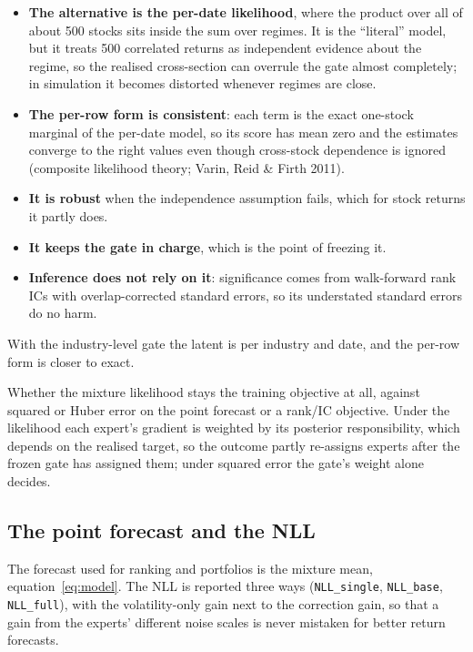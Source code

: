 \begin{whybox}
\begin{itemize}
\item \textbf{The alternative is the per-date likelihood}, where the product over all of about 500 stocks sits inside the
  sum over regimes. It is the ``literal'' model, but it treats 500 correlated returns as independent
  evidence about the regime, so the realised cross-section can overrule the gate almost completely; in
  simulation it becomes distorted whenever regimes are close.
\item \textbf{The per-row form is consistent}: each term is the exact one-stock marginal of the per-date model,
  so its score has mean zero and the estimates converge to the right values even though cross-stock
  dependence is ignored (composite likelihood theory; Varin, Reid \& Firth 2011).
\item \textbf{It is robust} when the independence assumption fails, which for stock returns it partly does.
\item \textbf{It keeps the gate in charge}, which is the point of freezing it.
\item \textbf{Inference does not rely on it}: significance comes from walk-forward rank ICs with
  overlap-corrected standard errors, so its understated standard errors do no harm.
\end{itemize}
With the industry-level gate the latent is per industry and date, and the per-row form is closer to exact.
\end{whybox}

 Whether the mixture likelihood stays the training objective at all, against squared or Huber
error on the point forecast or a rank/IC objective. Under the likelihood each expert's gradient is
weighted by its posterior responsibility, which depends on the realised target, so the outcome partly
re-assigns experts after the frozen gate has assigned them; under squared error the gate's weight alone
decides.

\subsection{The point forecast and the NLL}

The forecast used for ranking and portfolios is the mixture mean, equation~\eqref{eq:model}. The NLL is
reported three ways (\texttt{NLL\_single}, \texttt{NLL\_base}, \texttt{NLL\_full}), with the
volatility-only gain next to the correction gain, so that a gain from the experts' different noise
scales is never mistaken for better return forecasts.

